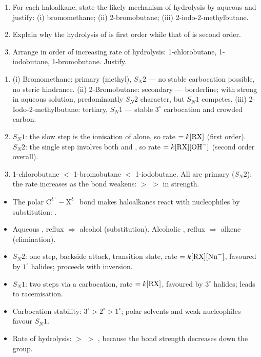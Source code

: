 \documentclass[11pt]{article}
\begin{document}
\begin{exercice}
\begin{enumerate}
\item For each haloalkane, state the likely mechanism of hydrolysis by aqueous  and justify: (i) bromomethane; (ii) 2-bromobutane; (iii) 2-iodo-2-methylbutane.
\item Explain why the hydrolysis of  is first order while that of  is second order.
\item Arrange in order of increasing rate of hydrolysis: 1-chlorobutane, 1-iodobutane, 1-bromobutane. Justify.
\end{enumerate}
\end{exercice}

\begin{corrige}[Exercise 1]
\begin{enumerate}
\item (i) Bromomethane: primary (methyl), $S_N2$ --- no stable carbocation possible, no steric hindrance. (ii) 2-Bromobutane: secondary --- borderline; with strong  in aqueous solution, predominantly $S_N2$ character, but $S_N1$ competes. (iii) 2-Iodo-2-methylbutane: tertiary, $S_N1$ --- stable $3^{\circ}$ carbocation and crowded carbon.
\item $S_N1$: the slow step is the ionisation of  alone, so rate $= k[\ce{RX}]$ (first order). $S_N2$: the single step involves both  and , so rate $= k[\ce{RX}][\ce{OH-}]$ (second order overall).
\item 1-chlorobutane $<$ 1-bromobutane $<$ 1-iodobutane. All are primary ($S_N2$); the rate increases as the  bond weakens:  $>$  $>$  in strength.
\end{enumerate}
\end{corrige}

\begin{aretenir}
\begin{itemize}
\item The polar \ensuremath{\mathrm{C^{\delta^{+}}-X^{\delta^{-}}}} bond makes haloalkanes react with nucleophiles by substitution: .
\item Aqueous , reflux $\Rightarrow$ alcohol (substitution). Alcoholic , reflux $\Rightarrow$ alkene (elimination).
\item $S_N2$: one step, backside attack, transition state, rate $=k[\ce{RX}][\ce{Nu-}]$, favoured by $1^{\circ}$ halides; proceeds with inversion.
\item $S_N1$: two steps via a carbocation, rate $=k[\ce{RX}]$, favoured by $3^{\circ}$ halides; leads to racemisation.
\item Carbocation stability: $3^{\circ} > 2^{\circ} > 1^{\circ}$; polar solvents and weak nucleophiles favour $S_N1$.
\item Rate of hydrolysis:  $>$  $>$ , because the  bond strength decreases down the group.
\end{itemize}
\end{aretenir}
\end{document}
